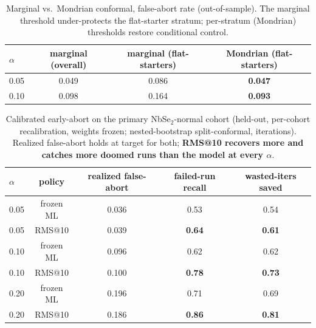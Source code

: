 \documentclass[11pt]{article}
\begin{document}
\begin{table}[h]\centering
\caption{Marginal vs.\ Mondrian conformal, false-abort rate (out-of-sample). The marginal threshold
under-protects the flat-starter stratum; per-stratum (Mondrian) thresholds restore conditional control.}
\label{tab:mondrian}
\begin{tabular}{lccc}
\toprule
$\alpha$ & marginal (overall) & marginal (flat-starters) & Mondrian (flat-starters) \\
\midrule
0.05 & 0.049 & 0.086 & \textbf{0.047} \\
0.10 & 0.098 & 0.164 & \textbf{0.093} \\
\bottomrule
\end{tabular}
\end{table}

\begin{table}[h]\centering
\caption{Calibrated early-abort on the primary NbSe$_2$-normal cohort (held-out, per-cohort
recalibration, weights frozen; nested-bootstrap split-conformal, iterations). Realized false-abort holds
at target for both; \textbf{RMS@10 recovers more and catches more doomed runs than the model at every
$\alpha$}.}
\label{tab:g1}
\begin{tabular}{lcccc}
\toprule
$\alpha$ & policy & realized false-abort & failed-run recall & wasted-iters saved \\
\midrule
0.05 & frozen ML & 0.036 & 0.53 & 0.54 \\
0.05 & RMS@10    & 0.039 & \textbf{0.64} & \textbf{0.61} \\
0.10 & frozen ML & 0.096 & 0.62 & 0.62 \\
0.10 & RMS@10    & 0.100 & \textbf{0.78} & \textbf{0.73} \\
0.20 & frozen ML & 0.196 & 0.71 & 0.69 \\
0.20 & RMS@10    & 0.186 & \textbf{0.86} & \textbf{0.81} \\
\bottomrule
\end{tabular}
\end{table}
\end{document}
